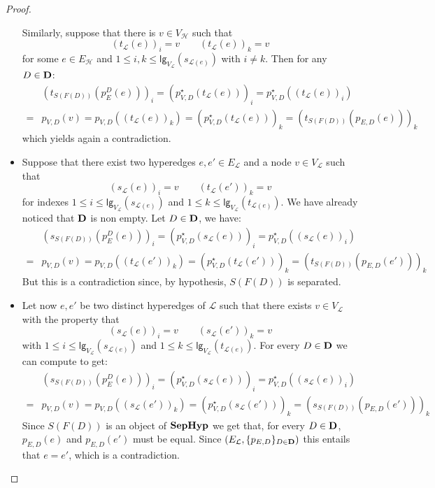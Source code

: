 \documentclass[3p]{elsarticle}
\newcommand{\lgh}{\mathsf{lg}}
\def\D{\textbf {\textup{D}}}
\newcommand{\catname}[1]{\textbf{\textup{#1}}}
\newcommand{\shyp}{\catname{SepHyp}}
\theoremstyle{remark}
\theoremstyle{definition}
\begin{document}
\begin{proof}
\begin{itemize}
		Similarly, suppose that there is $v\in V_{\mathcal{H}}$ such that
			\[(t_{\mathcal{L}}(e))_i=v \qquad  (t_{\mathcal{L}}(e) )_k= v\]
			for some $e\in E_{\mathcal{H}}$ and $1\leq i, k \leq \lgh_{V_{\mathcal{L}}}(s_{\mathcal{L}(e)})$ with $i\neq k$. Then for any $D\in \D$:
			\begin{align*}
				&(t_{S(F(D))}( p^D_{E}(e)))_i = ( p^\star_{V,D}(t_{\mathcal{L}}(e)))_i=p^\star_{V, D}((t_{\mathcal{L}}(e))_i)\\=&p_{V,D}(v)=p_{V, D}((t_{\mathcal{L}}(e))_k)=(p^\star_{V,D}(t_{\mathcal{L}}(e)))_k=(t_{S(F(D))}( p_{E,D}(e)))_k  	
			\end{align*}
			which yields again a contradiction.
		\item Suppose that there exist two hyperedges $e, e'\in E_{\mathcal{L}}$ and  a node $v\in V_{\mathcal{L}}$ such that \[(s_{\mathcal{L}}(e))_i=v \qquad  (t_{\mathcal{L}}(e') )_k= v\]
		for indexes $1\leq i \leq \lgh_{V_{\mathcal{L}}}(s_{\mathcal{L}(e)})$ and $1\leq k \leq \lgh_{V_{\mathcal{L}}}(t_{\mathcal{L}(e)}) $. We have already noticed that $\D$ is non empty. Let $D\in \D$, we have:
		\begin{align*}&(s_{S(F(D))}( p^D_{E}(e)))_i = ( p^\star_{V,D}(s_{\mathcal{L}}(e)))_i=p^\star_{V, D}((s_{\mathcal{L}}(e))_i)\\=&p_{V,D}(v)=p_{V, D}((t_{\mathcal{L}}(e'))_k)=(p^\star_{V,D}(t_{\mathcal{L}}(e')))_k=(t_{S(F(D))}( p_{E,D}(e')))_k  	
		\end{align*}
		But this is a contradiction since, by hypothesis, $S(F(D))$ is separated. 
		\item Let now $e, e'$ be two distinct hyperedges of $\mathcal{L}$ such that there exists $v\in V_{\mathcal{L}}$ with the property that 
		 \[(s_{\mathcal{L}}(e))_i=v \qquad  (s_{\mathcal{L}}(e') )_k= v\]
		with $1\leq i \leq \lgh_{V_{\mathcal{L}}}(s_{\mathcal{L}(e)})$ and $1\leq k \leq \lgh_{V_{\mathcal{L}}}(t_{\mathcal{L}(e)}) $. For every $D\in \D$ we can compute to get:
		\begin{align*}&(s_{S(F(D))}( p^D_{E}(e)))_i = ( p^\star_{V,D}(s_{\mathcal{L}}(e)))_i=p^\star_{V, D}((s_{\mathcal{L}}(e))_i)\\=&p_{V,D}(v)=p_{V, D}((s_{\mathcal{L}}(e'))_k)=(p^\star_{V,D}(s_{\mathcal{L}}(e')))_k=(s_{S(F(D))}( p_{E,D}(e')))_k  	
		\end{align*}
		Since $S(F(D))$ is an object of $\shyp$ we get that, for every $D\in \D$,  $p_{E,D}(e)$ and $p_{E,D}(e')$ must be equal.  Since $(E_\mathcal{L}, \{p_{E, D}\}_{D\in \D})$ this entails that $e = e'$, which is a contradiction.

\end{itemize}
\end{proof}
\end{document}
